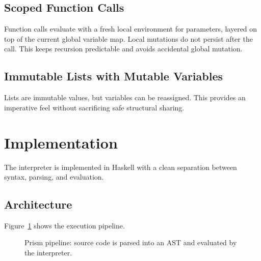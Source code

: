 \documentclass[11pt]{article}
\begin{document}
\subsection{Scoped Function Calls}
Function calls evaluate with a fresh local environment for parameters, layered on top of the current global variable map. Local mutations do not persist after the call. This keeps recursion predictable and avoids accidental global mutation.

\subsection{Immutable Lists with Mutable Variables}
Lists are immutable values, but variables can be reassigned. This provides an imperative feel without sacrificing safe structural sharing.

\section{Implementation}
The interpreter is implemented in Haskell with a clean separation between syntax, parsing, and evaluation.

\subsection{Architecture}
Figure~\ref{fig:pipeline} shows the execution pipeline.

\begin{figure}[h]
\centering
{}
\caption{Prism pipeline: source code is parsed into an AST and evaluated by the interpreter.}
\label{fig:pipeline}
\end{figure}
\end{document}
